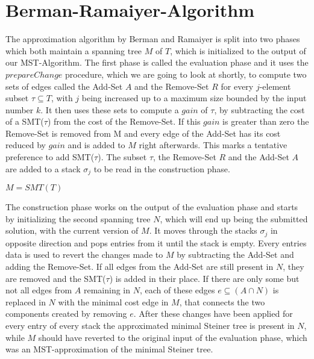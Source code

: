 \section{Berman-Ramaiyer-Algorithm}

The approximation algorithm by Berman and Ramaiyer is split into two phases which both maintain a spanning tree $M$ of $T$, which is initialized to the output of our MST-Algorithm. The first phase is called the evaluation phase and it uses the $prepareChange$ procedure, which we are going to look at shortly, to compute two sets of edges called the Add-Set $A$ and the Remove-Set $R$ for every $j$-element subset $\tau \subseteq T$, with $j$ being increased up to a maximum size bounded by the input number $k$. It then uses these sets to compute a $gain$ of $\tau$, by subtracting the cost of a SMT($\tau$) from the cost of the Remove-Set. If this $gain$ is greater than zero the Remove-Set is removed from M and every edge of the Add-Set has its cost reduced by $gain$ and is added to $M$ right afterwards. This marks a tentative preference to add SMT($\tau$). The subset $\tau$, the Remove-Set $R$ and the Add-Set $A$ are added to a stack $\sigma_j$ to be read in the construction phase.

\begin{algorithm}[ht]
$M = SMT(T)$\;						
\label{fig:evaluationPseudo}
\end{algorithm}

The construction phase works on the output of the evaluation phase and starts by initializing the second spanning tree $N$, which will end up being the submitted solution, with the current version of $M$. It moves through the stacks $\sigma_j$ in opposite direction and pops entries from it until the stack is empty. Every entries data is used to revert the changes made to $M$ by subtracting the Add-Set and adding the Remove-Set. If all edges from the Add-Set are still present in $N$, they are removed and the SMT($\tau$) is added in their place. If there are only some but not all edges from $A$ remaining in $N$, each of these edges $e \subseteq (A\cap N)$ is replaced in $N$ with the minimal cost edge in $M$, that connects the two components created by removing $e$. After these changes have been applied for every entry of every stack the approximated minimal Steiner tree is present in $N$, while $M$ should have reverted to the original input of the evaluation phase, which was an MST-approximation of the minimal Steiner tree. 

